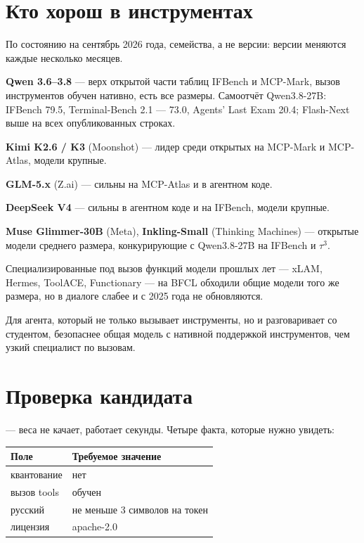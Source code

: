 \documentclass[11pt,a4paper]{article}
\begin{document}
\section{Кто хорош в инструментах}

По состоянию на сентябрь 2026 года, семейства, а не версии: версии
меняются каждые несколько месяцев.

\textbf{Qwen 3.6--3.8} --- верх открытой части таблиц IFBench и MCP-Mark,
вызов инструментов обучен нативно, есть все размеры. Самоотчёт
Qwen3.8-27B: IFBench 79.5, Terminal-Bench 2.1 --- 73.0, Agents' Last Exam
20.4; Flash-Next выше на всех опубликованных строках.

\textbf{Kimi K2.6 / K3} (Moonshot) --- лидер среди открытых на MCP-Mark
и MCP-Atlas, модели крупные.

\textbf{GLM-5.x} (Z.ai) --- сильны на MCP-Atlas и в агентном коде.

\textbf{DeepSeek V4} --- сильны в агентном коде и на IFBench,
модели крупные.

\textbf{Muse Glimmer-30B} (Meta), \textbf{Inkling-Small} (Thinking
Machines) --- открытые модели среднего размера, конкурирующие с Qwen3.8-27B
на IFBench и $\tau^3$.

Специализированные под вызов функций модели прошлых лет --- xLAM, Hermes,
ToolACE, Functionary --- на BFCL обходили общие модели того же размера,
но в диалоге слабее и с 2025 года не обновляются.

\begin{keybox}
Для агента, который не только вызывает инструменты, но и разговаривает
со студентом, безопаснее общая модель с нативной поддержкой инструментов,
чем узкий специалист по вызовам.
\end{keybox}

\section{Проверка кандидата}

 — веса не качает, работает секунды.
Четыре факта, которые нужно увидеть:

\begin{tabular}{@{}ll@{}}
\toprule
\textbf{Поле} & \textbf{Требуемое значение} \\
\midrule
квантование & нет \\
вызов tools & обучен \\
русский     & не меньше 3 символов на токен \\
лицензия    & apache-2.0 \\
\bottomrule
\end{tabular}
\end{document}
